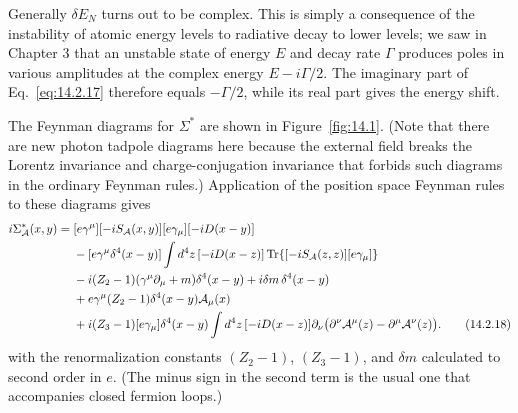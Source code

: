 Generally $\delta E_N$ turns out to be complex. This is simply a consequence
of the instability of atomic energy levels to radiative decay to lower levels;
we saw in Chapter 3 that an unstable state of energy $E$ and decay rate $\Gamma$
produces poles in various amplitudes at the complex energy $E-i\Gamma/2$. The
imaginary part of Eq.~\eqref{eq:14.2.17} therefore equals $-\Gamma/2$, while its
real part gives the energy shift.

The Feynman diagrams for $\Sigma^*$ are shown in Figure~\ref{fig:14.1}. (Note
that there are new photon tadpole diagrams here because the external field
breaks the Lorentz invariance and charge-conjugation invariance that forbids
such diagrams in the ordinary Feynman rules.) Application of the position
space Feynman rules to these diagrams gives
\begin{align}
 i\Sigma^*_{\mathcal A}(x,y)={}&
 [e\gamma^\mu][-iS_{\mathcal A}(x,y)][e\gamma_\mu][-iD(x-y)]
 \notag\\
 &-[e\gamma^\mu\delta^4(x-y)]\int d^4z\,[-iD(x-z)]
 \operatorname{Tr}\{[-iS_{\mathcal A}(z,z)][e\gamma_\mu]\}
 \notag\\
 &-i(Z_2-1)(\gamma^\mu\partial_\mu+m)\delta^4(x-y)
 +i\delta m\,\delta^4(x-y)
 \notag\\
 &+e\gamma^\mu(Z_2-1)\delta^4(x-y)\mathcal A_\mu(x)
 \notag\\
 &+i(Z_3-1)[e\gamma_\mu]\delta^4(x-y)\int d^4z\,[-iD(x-z)]
 \partial_\nu\bigl(\partial^\nu\mathcal A^\mu(z)-\partial^\mu\mathcal A^\nu(z)\bigr).
 \tag{14.2.18}\label{eq:14.2.18}
\end{align}
with the renormalization constants $(Z_2-1)$, $(Z_3-1)$, and $\delta m$
calculated to second order in $e$. (The minus sign in the second term is the
usual one that accompanies closed fermion loops.)

